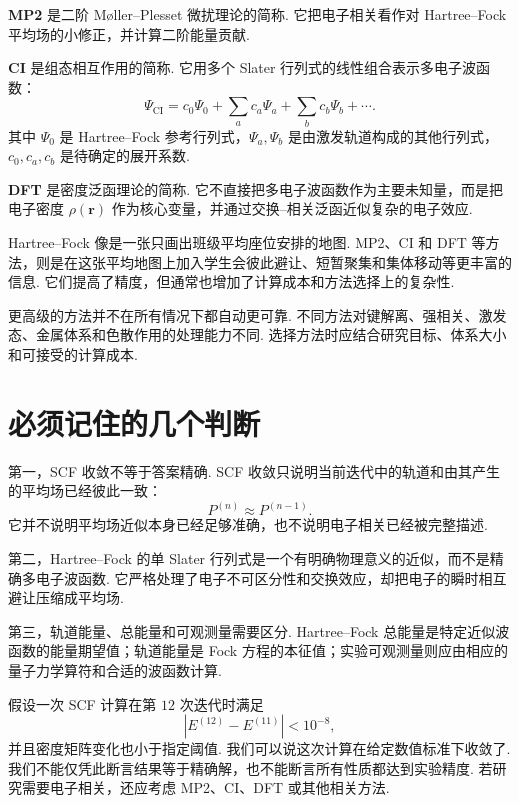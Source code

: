 \documentclass[UTF8,11pt,a4paper,openany]{ctexbook}
\newcommand{\term}[1]{\textbf{#1}}
\begin{document}
\term{MP2} 是二阶 Møller--Plesset 微扰理论的简称. 它把电子相关看作对 Hartree--Fock 平均场的小修正，并计算二阶能量贡献. 

\term{CI} 是组态相互作用的简称. 它用多个 Slater 行列式的线性组合表示多电子波函数：
\[
\Psi_{\mathrm{CI}}
=
c_0\Psi_0+\sum_a c_a\Psi_a+\sum_b c_b\Psi_b+\cdots.
\]
其中 $\Psi_0$ 是 Hartree--Fock 参考行列式，$\Psi_a,\Psi_b$ 是由激发轨道构成的其他行列式，$c_0,c_a,c_b$ 是待确定的展开系数. 

\term{DFT} 是密度泛函理论的简称. 它不直接把多电子波函数作为主要未知量，而是把电子密度 $\rho(\mathbf r)$ 作为核心变量，并通过交换--相关泛函近似复杂的电子效应. 

\begin{analogybox}
Hartree--Fock 像是一张只画出班级平均座位安排的地图. MP2、CI 和 DFT 等方法，则是在这张平均地图上加入学生会彼此避让、短暂聚集和集体移动等更丰富的信息. 它们提高了精度，但通常也增加了计算成本和方法选择上的复杂性. 
\end{analogybox}

\begin{limitbox}
更高级的方法并不在所有情况下都自动更可靠. 不同方法对键解离、强相关、激发态、金属体系和色散作用的处理能力不同. 选择方法时应结合研究目标、体系大小和可接受的计算成本. 
\end{limitbox}

\section{必须记住的几个判断}

第一，SCF 收敛不等于答案精确. SCF 收敛只说明当前迭代中的轨道和由其产生的平均场已经彼此一致：
\[
P^{(n)}\approx P^{(n-1)}.
\]
它并不说明平均场近似本身已经足够准确，也不说明电子相关已经被完整描述. 

第二，Hartree--Fock 的单 Slater 行列式是一个有明确物理意义的近似，而不是精确多电子波函数. 它严格处理了电子不可区分性和交换效应，却把电子的瞬时相互避让压缩成平均场. 

第三，轨道能量、总能量和可观测量需要区分. Hartree--Fock 总能量是特定近似波函数的能量期望值；轨道能量是 Fock 方程的本征值；实验可观测量则应由相应的量子力学算符和合适的波函数计算. 

\begin{examplebox}
假设一次 SCF 计算在第 $12$ 次迭代时满足
\[
|E^{(12)}-E^{(11)}|<10^{-8},
\]
并且密度矩阵变化也小于指定阈值. 我们可以说这次计算在给定数值标准下收敛了. 我们不能仅凭此断言结果等于精确解，也不能断言所有性质都达到实验精度. 若研究需要电子相关，还应考虑 MP2、CI、DFT 或其他相关方法. 
\end{examplebox}
\end{document}
